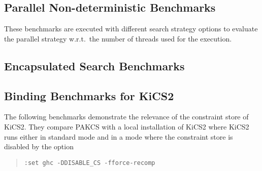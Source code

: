 \documentclass{scrartcl}
\begin{document}
\subsection{Parallel Non-deterministic Benchmarks}

These benchmarks are executed with different search strategy options
to evaluate the parallel strategy w.r.t.\ the number
of threads used for the execution.

\begin{center}
\end{center}


\subsection{Encapsulated Search Benchmarks}

\begin{center}
\end{center}


\subsection{Binding Benchmarks for KiCS2}

The following benchmarks demonstrate the relevance of the
constraint store of KiCS2. They compare PAKCS with a local installation
of KiCS2 where KiCS2 runs either in standard mode and
in a mode where the constraint store is disabled by the option
\begin{quote}
\texttt{:set ghc -DDISABLE\_CS -fforce-recomp}
\end{quote}

\begin{center}
\end{center}
\end{document}
